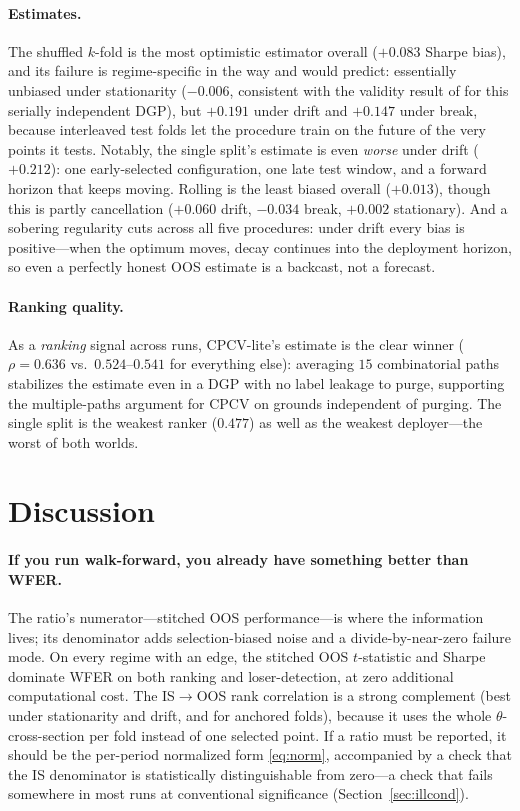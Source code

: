 \documentclass[11pt]{article}
\begin{document}
\paragraph{Estimates.} The shuffled $k$-fold is the most optimistic estimator
overall ($+0.083$ Sharpe bias), and its failure is regime-specific in the
way \citet{lopezdeprado2018advances} and \citet{cerqueira2020evaluating}
would predict: essentially unbiased under stationarity ($-0.006$, consistent
with the validity result of \citet{bergmeir2018note} for this serially
independent DGP), but $+0.191$ under drift and $+0.147$ under break, because
interleaved test folds let the procedure train on the future of the very
points it tests. Notably, the single split's estimate is even \emph{worse}
under drift ($+0.212$): one early-selected configuration, one late test
window, and a forward horizon that keeps moving. Rolling is the least biased
overall ($+0.013$), though this is partly cancellation ($+0.060$ drift,
$-0.034$ break, $+0.002$ stationary). And a sobering regularity cuts across
all five procedures: under drift every bias is positive---when the optimum
moves, decay continues into the deployment horizon, so even a perfectly
honest OOS estimate is a backcast, not a forecast.

\paragraph{Ranking quality.} As a \emph{ranking} signal across runs,
CPCV-lite's estimate is the clear winner ($\rho = 0.636$ vs.\
$0.524$--$0.541$ for everything else): averaging $15$ combinatorial paths
stabilizes the estimate even in a DGP with no label leakage to purge,
supporting the multiple-paths argument for CPCV
\citep{lopezdeprado2018advances} on grounds independent of purging. The
single split is the weakest ranker ($0.477$) as well as the weakest
deployer---the worst of both worlds.

\section{Discussion}
\label{sec:discussion}

\paragraph{If you run walk-forward, you already have something better than
WFER.} The ratio's numerator---stitched OOS performance---is where the
information lives; its denominator adds selection-biased noise and a
divide-by-near-zero failure mode. On every regime with an edge, the stitched
OOS $t$-statistic and Sharpe dominate WFER on both ranking and
loser-detection, at zero additional computational cost. The IS$\to$OOS rank
correlation is a strong complement (best under stationarity and drift, and
for anchored folds), because it uses the whole $\theta$-cross-section per
fold instead of one selected point. If a ratio must be reported, it should be
the per-period normalized form \eqref{eq:norm}, accompanied by a check that
the IS denominator is statistically distinguishable from zero---a check that
fails somewhere in most runs at conventional significance
(Section~\ref{sec:illcond}).
\end{document}
